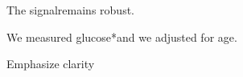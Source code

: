 \documentclass{article}
\begin{document}
\begin{listing-tex}    
  The signalremains robust.\par
  We measured glucose\Incidental[em-dash]*{and we adjusted for age}.\par
   Emphasize clarity
\end{listing-tex}
\end{document}
